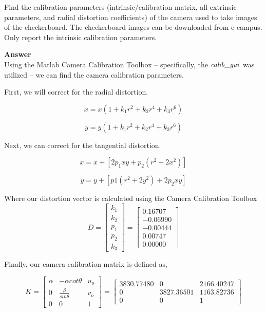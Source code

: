 \documentclass[12pt, letterpaper]{article}
\begin{document}

\vspace{1.5cm}
 \hspace{0.4cm} Find the calibration parameters (intrinsic/calibration matrix, all extrinsic parameters, and radial distortion coefficients) of the camera used to take images of the checkerboard. The checkerboard images can be downloaded from e-campus. Only report the intrinsic
calibration parameters.

{\bf{ Answer \\}} Using the Matlab Camera Calibration Toolbox -- specifically, the ${\it{calib\_gui}}$ was utilized -- we can find the camera calibration parameters. 

First, we will correct for the radial distortion.

$$ x = x(1+k_1r^2 + k_2r^4 + k_3r^6) $$

$$ y = y(1 + k_1r^2 + k_2r^4 + k_3r^6) $$ 

Next, we can correct for the tangential distortion. 

$$ x = x + [ 2p_1xy + p_2(r^2+2x^2)] $$ 

$$ y = y + [p1(r^2+2y^2)+2p_2xy] $$  

Where our distortion vector is calculated using the Camera Calibration Toolbox 
$$
D = \begin{bmatrix} k_1\\k_2\\p_1\\p_2\\k_3  \end{bmatrix} = \begin{bmatrix} 0.16707\\-0.06990\\-0.00444\\0.00747\\0.00000  \end{bmatrix} $$

Finally, our camera calibration matrix is defined as,

$$ 
K = \begin{bmatrix}  \alpha&-\alpha cot \theta & u_o \\ 0& \frac{\beta}{sin \theta} & v_o \\ 0&0&1  \end{bmatrix} = \begin{bmatrix}  3830.77480 & 0 & 2166.40247 \\ 0& 3827.36501 & 1163.82736 \\ 0&0&1  \end{bmatrix}
$$
\indent 
\end{document}
